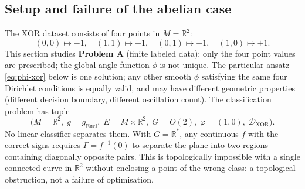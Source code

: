 \documentclass[11pt, a4paper]{article}
\theoremstyle{plain}
\theoremstyle{definition}
\newcommand{\R}{\mathbb{R}}
\newcommand{\Gam}{\Gamma}
\begin{document}
\subsection{Setup and failure of the abelian case}

The XOR dataset consists of four points in $M = \R^2$:
\[
  (0,0) \mapsto -1,\quad (1,1) \mapsto -1,\quad
  (0,1) \mapsto +1,\quad (1,0) \mapsto +1.
\]
This section studies \textbf{Problem A} (finite labeled data): only the four
point values are prescribed; the global angle function $\phi$ is not unique.
The particular ansatz \eqref{eq:phi-xor} below is one solution; any other smooth
$\phi$ satisfying the same four Dirichlet conditions is equally valid, and may
have different geometric properties (different decision boundary, different
oscillation count). The classification problem has tuple
\[
  \bigl(M = \R^2,\; g = g_{\mathrm{Eucl}},\; E = M\times\R^2,\;
        G = O(2),\; \varphi = (1,0),\; \mathcal{D}_{\mathrm{XOR}}\bigr).
\]
No linear classifier separates them. With $G = \R^*$, any continuous $f$ with the
correct signs requires $\Gam = f^{-1}(0)$ to separate the plane into two regions
containing diagonally opposite pairs. This is topologically impossible with a
single connected curve in $\R^2$ without enclosing a point of the wrong class:
a topological obstruction, not a failure of optimisation.
\end{document}
